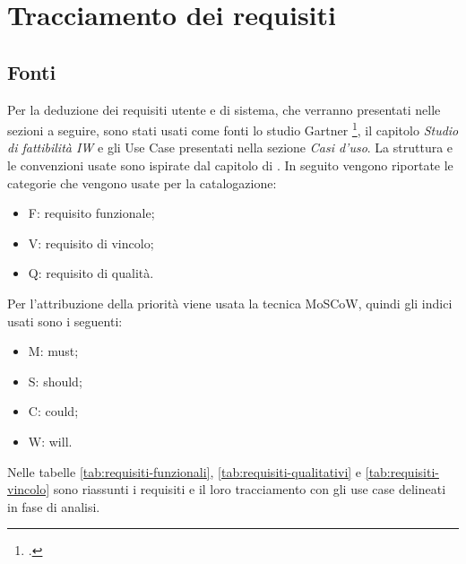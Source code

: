 \section{Tracciamento dei requisiti}

\subsection{Fonti}
Per la deduzione dei requisiti utente e di sistema, che verranno presentati nelle sezioni a seguire, sono stati usati come fonti lo studio Gartner \footcite{farah:The-Dawn-of-Decentralized-Identity}, il capitolo \emph{Studio di fattibilità IW} e gli Use Case presentati nella sezione \emph{Casi d'uso}. La struttura e le convenzioni usate sono ispirate dal capitolo di \cite{som:swe}. In seguito vengono riportate le categorie che vengono usate per la catalogazione:
\begin{itemize}
    \item F: requisito funzionale;
    \item V: requisito di vincolo;
    \item Q: requisito di qualità.
\end{itemize}
    
Per l’attribuzione della priorità viene usata la tecnica MoSCoW, quindi gli indici usati sono i seguenti:
\begin{itemize}
    \item M: must;
    \item S: should; 
    \item C: could; 
    \item W: will.
\end{itemize} 
    
Nelle tabelle \ref{tab:requisiti-funzionali}, \ref{tab:requisiti-qualitativi} e \ref{tab:requisiti-vincolo} sono riassunti i requisiti e il loro tracciamento con gli use case delineati in fase di analisi.

